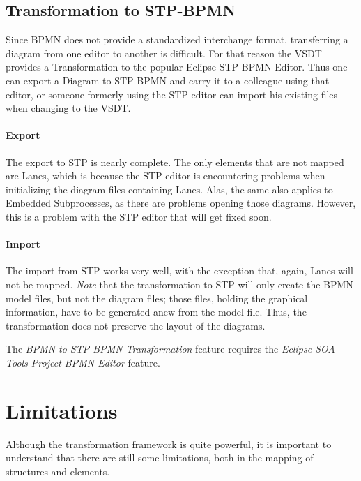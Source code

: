 \subsection{Transformation to STP-BPMN}
\label{sec:user_trafo_stp}

Since BPMN does not provide a standardized interchange format, transferring a
diagram from one editor to another is difficult.  For that reason the VSDT provides
a Transformation to the popular Eclipse STP-BPMN Editor.  Thus one can export a
Diagram to STP-BPMN and carry it to a colleague using that editor, or someone
formerly using the STP editor can import his existing files when changing to the
VSDT.

\paragraph{Export}
The export to STP is nearly complete.  The only elements that are not mapped are
Lanes, which is because the STP editor is encountering problems when initializing
the diagram files containing Lanes.  Alas, the same also applies to Embedded
Subprocesses, as there are problems opening those diagrams.  However, this is a
problem with the STP editor that will get fixed soon.

\paragraph{Import}
The import from STP works very well, with the exception that, again, Lanes will
not be mapped. \emph{Note} that the transformation to STP will only create the
BPMN model files, but not the diagram files; those files, holding the graphical
information, have to be generated anew from the model file.  Thus, the transformation
does not preserve the layout of the diagrams.

The \emph{BPMN to STP-BPMN Transformation} feature requires the \emph{Eclipse SOA
Tools Project BPMN Editor} feature.



\section{Limitations}
\label{sec:user_trafo_limits}

Although the transformation framework is quite powerful, it is important to
understand that there are still some limitations, both in the mapping of structures
and elements.

